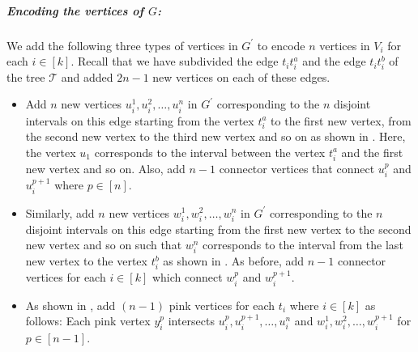 \subparagraph*{Encoding the vertices of $G$:}
We add the following three types of vertices in $G^{\prime}$ to encode
$n$ vertices in $V_i$ for each $i \in [k]$.
Recall that we have subdivided the edge $t_it_i^a$ and the edge $t_it_i^b$
of the tree $\mathcal{T}$ and added $2n-1$ new vertices on each of
these edges.
\begin{itemize}
\item
Add $n$ new vertices $u_i^1,u_i^2,\ldots,u_i^n$ in $G^\prime$
corresponding to the $n$ disjoint intervals on this edge starting
from the vertex $t_i^a$ 
to the first new vertex, from the second new vertex to the third new vertex and so on as shown in
. Here, the vertex $u_1$ corresponds to the interval between the vertex $t_i^a$ and the first new vertex and so on.
Also, add $n-1$ connector vertices that
connect $u_i^p$ and $u_i^{p+1}$ where $p\in [n]$.
\item
Similarly, add $n$ new vertices $w_i^1,w_i^2,\ldots,w_i^n$ in $G^\prime$
corresponding to the $n$ disjoint intervals on this edge starting
from the first new vertex to the second new vertex and so on such that $w_i^n$
corresponds to the interval from the last new vertex to the vertex $t_i^b$ as shown in .
As before, add $n-1$  connector vertices for each
$i\in[k]$ which connect $w_i^p$ and $w_i^{p+1}$.
\item As shown in , add $(n-1)$ pink vertices
for each $t_i$ where $i\in [k]$ as follows:
Each pink vertex $y_i^p$ intersects ${u_i^p,u_i^{p+1},\ldots,u_i^n}$
and ${w_i^1,w_i^2,\ldots,w_i^{p+1}}$ for $p\in [n-1]$.
\end{itemize}


